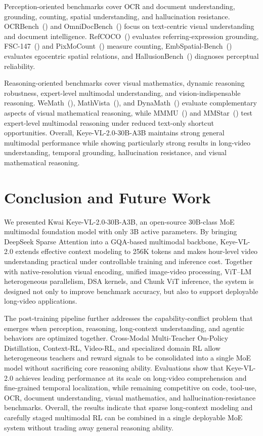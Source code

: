 \documentclass{article} %
\begin{document}
Perception-oriented benchmarks cover OCR and document understanding, grounding, counting, spatial understanding, and hallucination resistance. OCRBench~(\cite{ocrbench}) and OmniDocBench~(\cite{omnidocbench}) focus on text-centric visual understanding and document intelligence. RefCOCO~(\cite{refcoco}) evaluates referring-expression grounding, FSC-147~(\cite{fsc_147}) and PixMoCount~(\cite{pixmo}) measure counting, EmbSpatial-Bench~(\cite{embspatialbench}) evaluates egocentric spatial relations, and HallusionBench~(\cite{hallusionbench}) diagnoses perceptual reliability.

Reasoning-oriented benchmarks cover visual mathematics, dynamic reasoning robustness, expert-level multimodal understanding, and vision-indispensable reasoning. WeMath~(\cite{wemath}), MathVista~(\cite{mathvista}), and DynaMath~(\cite{dynamath}) evaluate complementary aspects of visual mathematical reasoning, while MMMU~(\cite{mmmu}) and MMStar~(\cite{mm_star}) test expert-level multimodal reasoning under reduced text-only shortcut opportunities. Overall, Keye-VL-2.0-30B-A3B maintains strong general multimodal performance while showing particularly strong results in long-video understanding, temporal grounding, hallucination resistance, and visual mathematical reasoning.



\section{Conclusion and Future Work}

We presented Kwai Keye-VL-2.0-30B-A3B, an open-source 30B-class MoE multimodal foundation model with only 3B active parameters. By bringing DeepSeek Sparse Attention into a GQA-based multimodal backbone, Keye-VL-2.0 extends effective context modeling to 256K tokens and makes hour-level video understanding practical under controllable training and inference cost. Together with native-resolution visual encoding, unified image-video processing, ViT--LM heterogeneous parallelism, DSA kernels, and Chunk ViT inference, the system is designed not only to improve benchmark accuracy, but also to support deployable long-video applications.

The post-training pipeline further addresses the capability-conflict problem that emerges when perception, reasoning, long-context understanding, and agentic behaviors are optimized together. Cross-Modal Multi-Teacher On-Policy Distillation, Context-RL, Video-RL, and specialized domain RL allow heterogeneous teachers and reward signals to be consolidated into a single MoE model without sacrificing core reasoning ability. Evaluations show that Keye-VL-2.0 achieves leading performance at its scale on long-video comprehension and fine-grained temporal localization, while remaining competitive on code, tool-use, OCR, document understanding, visual mathematics, and hallucination-resistance benchmarks. Overall, the results indicate that sparse long-context modeling and carefully staged multimodal RL can be combined in a single deployable MoE system without trading away general reasoning ability.
\end{document}
